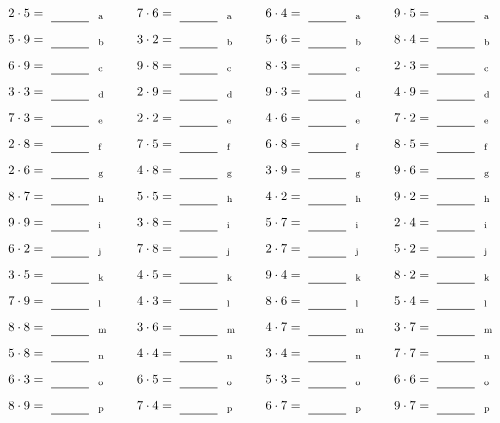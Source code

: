 \documentclass
[
  draft    = true,
  fontsize = 11pt,
  parskip  = half-
]
{scrartcl}
\begin{document}
\par\vfill\par
\begin{align*}
    \pline{2\cdot5}&=\rline{a}
  & \pline{7\cdot6}&=\rline{a}
  & \pline{6\cdot4}&=\rline{a}
  & \pline{9\cdot5}&=\rline{a} \\[1ex]
    \pline{5\cdot9}&=\rline{b}
  & \pline{3\cdot2}&=\rline{b}
  & \pline{5\cdot6}&=\rline{b}
  & \pline{8\cdot4}&=\rline{b} \\[1ex]
    \pline{6\cdot9}&=\rline{c}
  & \pline{9\cdot8}&=\rline{c}
  & \pline{8\cdot3}&=\rline{c}
  & \pline{2\cdot3}&=\rline{c} \\[1ex]
    \pline{3\cdot3}&=\rline{d}
  & \pline{2\cdot9}&=\rline{d}
  & \pline{9\cdot3}&=\rline{d}
  & \pline{4\cdot9}&=\rline{d} \\[1ex]
    \pline{7\cdot3}&=\rline{e}
  & \pline{2\cdot2}&=\rline{e}
  & \pline{4\cdot6}&=\rline{e}
  & \pline{7\cdot2}&=\rline{e} \\[1ex]
    \pline{2\cdot8}&=\rline{f}
  & \pline{7\cdot5}&=\rline{f}
  & \pline{6\cdot8}&=\rline{f}
  & \pline{8\cdot5}&=\rline{f} \\[1ex]
    \pline{2\cdot6}&=\rline{g}
  & \pline{4\cdot8}&=\rline{g}
  & \pline{3\cdot9}&=\rline{g}
  & \pline{9\cdot6}&=\rline{g} \\[1ex]
    \pline{8\cdot7}&=\rline{h}
  & \pline{5\cdot5}&=\rline{h}
  & \pline{4\cdot2}&=\rline{h}
  & \pline{9\cdot2}&=\rline{h} \\[1ex]
    \pline{9\cdot9}&=\rline{i}
  & \pline{3\cdot8}&=\rline{i}
  & \pline{5\cdot7}&=\rline{i}
  & \pline{2\cdot4}&=\rline{i} \\[1ex]
    \pline{6\cdot2}&=\rline{j}
  & \pline{7\cdot8}&=\rline{j}
  & \pline{2\cdot7}&=\rline{j}
  & \pline{5\cdot2}&=\rline{j} \\[1ex]
    \pline{3\cdot5}&=\rline{k}
  & \pline{4\cdot5}&=\rline{k}
  & \pline{9\cdot4}&=\rline{k}
  & \pline{8\cdot2}&=\rline{k} \\[1ex]
    \pline{7\cdot9}&=\rline{l}
  & \pline{4\cdot3}&=\rline{l}
  & \pline{8\cdot6}&=\rline{l}
  & \pline{5\cdot4}&=\rline{l} \\[1ex]
    \pline{8\cdot8}&=\rline{m}
  & \pline{3\cdot6}&=\rline{m}
  & \pline{4\cdot7}&=\rline{m}
  & \pline{3\cdot7}&=\rline{m} \\[1ex]
    \pline{5\cdot8}&=\rline{n}
  & \pline{4\cdot4}&=\rline{n}
  & \pline{3\cdot4}&=\rline{n}
  & \pline{7\cdot7}&=\rline{n} \\[1ex]
    \pline{6\cdot3}&=\rline{o}
  & \pline{6\cdot5}&=\rline{o}
  & \pline{5\cdot3}&=\rline{o}
  & \pline{6\cdot6}&=\rline{o} \\[1ex]
    \pline{8\cdot9}&=\rline{p}
  & \pline{7\cdot4}&=\rline{p}
  & \pline{6\cdot7}&=\rline{p}
  & \pline{9\cdot7}&=\rline{p}
\end{align*}
\end{document}
